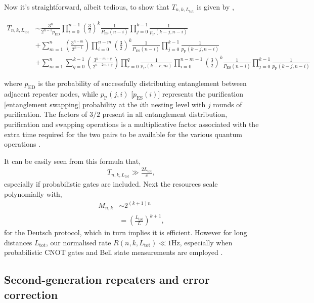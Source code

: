 Now it's straightforward, albeit tedious, to show that $T_{n,k,L_\mathrm{tot}}$ is given by \cite{bib:braztzik2013},
\begin{widetext}
\begin{align*}
 T_{n,k,L_\mathrm{tot}} &\sim \frac{3^n}{2^{n-1} p_\mathrm{ED}} \prod_{i=0}^{n-1} \left(\frac{3}{2}\right)^{k}  \frac{1}{P_\mathrm{ES}(n-i)  }\prod_{j=0}^{k-1} \frac{1}{p_\mathrm{P}(k-j,n-i)}  \nonumber \\
 &+\sum_{m=1}^n\left(\frac{3^{n-m}}{2^{n-1}}\right) \prod_{i=0}^{n-m}   \left(\frac{3}{2}\right)^{k} \frac{1}{P_\mathrm{ES}(n-i)}  \prod_{j=0}^{k-1}  \frac{1}{p_\mathrm{P}(k-j,n-i)}  \\
&+\sum_{m=1}^n {\sum_{q=0}^{k-1} \left(\frac{3^{n-m+q}}{2^{n- 2 m+q}}\right) \prod_{r=0}^{q}\frac{1}{p_\mathrm{P}(k-r,m)}} 
\prod_{i=0}^{n-m-1}   \left(\frac{3}{2}\right)^{k} \frac{1}{P_\mathrm{ES}(n-i)}  \prod_{j=0}^{k-1}  \frac{1}{p_\mathrm{P}(k-j,n-i)} \nonumber 
\end{align*}
\end{widetext}
where $p_\mathrm{ED}$ is the probability of successfully distributing entanglement between adjacent repeater nodes, while $p_\mathrm{P}(j,i)$ [$p_\mathrm{ES}(i)$] represents the purification [entanglement swapping] probability at the $i$th nesting level with $j$ rounds of purification. The factors of $3/2$ present in all entanglement distribution, purification and swapping operations is a multiplicative factor associated with the extra time required for the two pairs to be available for the various quantum operations \cite{bib:sangouard11}.

It can be easily seen from this formula that,
\begin{align}
	T_{n,k,L_\mathrm{tot}} \gg \frac{2 L_\mathrm{tot}}{c},
\end{align}
especially if probabilistic gates are included. Next the resources scale polynomially with,
\begin{align}
	M_{n,k} &\sim 2^{(k+1)n}\nonumber\\
	&= \left(\frac{L_\mathrm{tot}}{L}\right)^{k+1},
\end{align}
for the Deutsch protocol, which in turn implies it is efficient. However for long distances $L_\mathrm{tot}$, our normalised rate \mbox{$R(n,k,L_\mathrm{tot})\ll 1\mathrm{Hz}$}, especially when probabilistic CNOT gates and Bell state measurements are employed \cite{bib:jiang09, bib:munro10}.

\subsection{Second-generation repeaters and error correction}

